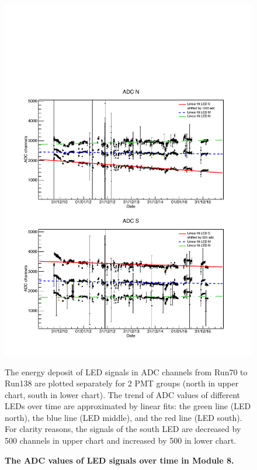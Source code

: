 \begin{figure}[ht]
  \centering
  \includegraphics[width=0.9\textwidth{}]{./fig/M8LED.pdf}
  \caption{\textbf{The ADC values of LED signals over time in Module 8.}} The energy deposit of LED signals in ADC channels from Run70 to Run138 are plotted separately for 2 PMT groups (north in upper chart, south in lower chart). The trend of ADC values of different LEDs over time are approximated by linear fits: the green line (LED north), the blue line (LED middle), and the red line (LED south). For clarity reasons, the signals of the south LED are decreased by 500 channels in upper chart and increased by 500 in lower chart.
  \label{fig:M8LED}
\end{figure}
